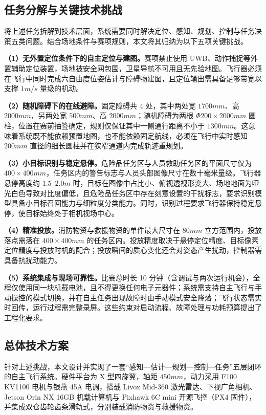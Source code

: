 \subsection{任务分解与关键技术挑战}

将上述任务拆解到技术层面，系统需要同时解决定位、感知、规划、控制与任务决策五类问题。结合场地条件与赛项规则，本文将其归纳为以下五项关键挑战。

\textbf{（1）无外置定位条件下的自主定位与建图。}赛项禁止使用 UWB、动作捕捉等外置辅助定位装置，场地被安全网包围，卫星导航不可用且无先验地图。飞行器必须在飞行中同时完成六自由度位姿估计与障碍物建图，且定位输出需具备足够带宽以支撑 $1\unit{m/s}$ 量级的机动。

\textbf{（2）随机障碍下的在线避障。}固定障碍共 4 处，其中两处宽 $1700\unit{mm}$、高 $2000\unit{mm}$，另两处宽 $500\unit{mm}$、高 $2000\unit{mm}$；随机障碍为两根 $\Phi200\times2000\unit{mm}$ 圆柱，位置在赛前抽签确定，规则仅保证其中一侧通行距离不小于 $1300\unit{mm}$。这意味着系统既不能依赖预置地图，也不能依赖固定航线，必须在飞行中实时感知 $200\unit{mm}$ 直径的细长圆柱并在狭窄通道内完成轨迹重规划。

\textbf{（3）小目标识别与稳定悬停。}危险品任务区与人员救助任务区的平面尺寸仅为 $400\times400\unit{mm}$，任务区内的警告标志与人员头部图像尺寸在数十毫米量级。飞行器悬停高度约 $1.5$--$2.0\unit{m}$ 时，目标在图像中占比小、俯视透视形变大、场地地面为哑光白色导致对比度偏低，且危险品任务区中存在刻意设置的干扰标志，要求识别模型具备小目标召回能力与细粒度分类能力。同时，识别过程要求飞行器保持稳定悬停，使目标始终处于相机视场中心。

\textbf{（4）精准投放。}消防物资与救援物资的单件最大尺寸在 $80\unit{mm}$ 立方范围内，投放落点需落在 $400\times400\unit{mm}$ 的任务区内。投放精度取决于悬停定位精度、目标像素定位精度与投放时机的配合；投放瞬间的质心变化还会对姿态产生扰动，控制器需具备抗扰动能力。

\textbf{（5）系统集成与现场可靠性。}比赛总时长 10 分钟（含调试与两次运行机会），全程仅使用同一块机载电池，且不得更换任何电子元器件；系统需支持自主飞行与手动操控的模式切换，并在自主任务出现故障时由手动模式安全降落；飞行状态需实时回传，运行过程需完整录屏。这些约束对启动流程、故障处理与功耗预算提出了工程化要求。

\subsection{总体技术方案}

针对上述挑战，本文设计并实现了一套“感知—估计—规划—控制—任务”五层闭环的自主飞行系统。硬件平台为 X 型四旋翼，轴距 $450\unit{mm}$，动力采用 F100 KV1100 电机与银燕 45A 电调，搭载 Livox Mid-360 激光雷达、下视广角相机、Jetson Orin NX 16GB 机载计算机与 Pixhawk 6C mini 开源飞控（PX4 固件），并集成双仓齿轮齿条滑轨式，分别装载消防物资与救援物资。

